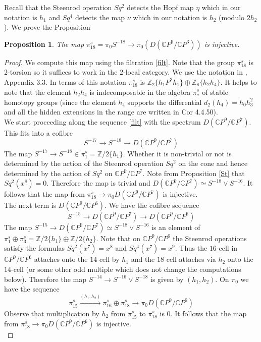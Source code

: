 \documentclass[a4paper,leqno,12pt]{amsart}
\theoremstyle{plain}
\newtheorem{prop}[theorem]{Proposition}
\theoremstyle{definition}
\numberwithin{equation}{section}
\begin{document}
Recall that the Steenrod operation $Sq^2$ detects the Hopf map $\eta$ which in our notation is $h_1$ and $Sq^4$ detects the map $\nu$ which in our notation is $h_2$ (modulo $2h_2$). We prove the Proposition
\begin{prop}\label{inj18}
The map $\pi_{18}^s = \pi_0 S^{-18} \to \pi_0 (D ({\mathbb{C}} P^9/ {\mathbb{C}} P^3))$ is injective. 
\end{prop}

\begin{proof}
We compute this map using the filtration \ref{filt}. Note that the group $\pi_{18}^s$ is $2$-torsion so it suffices to work in the $2$-local category. We use the notation in \cite{Rav}, Appendix 3.3. In terms of this notation $\pi_{18}^s$ is ${\mathbb{Z}}_2\{h_1P^2h_1\} \oplus {\mathbb{Z}}_8\{h_2h_4\}$. It helps to note that the element $h_2h_4$ is indecomposable in the algebra $\pi_*^s$ of stable homotopy groups (since the element $h_4$ supports the differential $d_2(h_4)=h_0 h_3^2$ and all the hidden extensions in the range are written in Cor 4.4.50). \\

We start proceeding along the sequence \ref{filt} with the spectrum $D({\mathbb{C}} P^9/ {\mathbb{C}} P^7)$. This fits into a cofibre 
$$S^{-17} \to S^{-18} \to D({\mathbb{C}} P^9/{\mathbb{C}} P^7)  $$
The map $S^{-17} \to S^{-18} \in \pi_1^s = {\mathbb{Z}}/2\{h_1\}$. Whether it is non-trivial or not is determined by the action of the Steenrod operation $Sq^2$ on the cone and hence determined by the action of $Sq^2$ on ${\mathbb{C}} P^9/{\mathbb{C}} P^7$. Note from Proposition \ref{St} that $Sq^2(x^8)=0$. Therefore the map is trivial and $D({\mathbb{C}} P^9/{\mathbb{C}} P^7) \simeq S^{-18}\vee S^{-16}$. It follows that the map from $\pi_{18}^s \to \pi_0 D({\mathbb{C}} P^9/ {\mathbb{C}} P^7)$ is injective. \\

The next term is $D({\mathbb{C}} P^9/ {\mathbb{C}} P^6)$. We have the cofibre sequence 
\begin{equation}\label{cof6}
S^{-15} \to D({\mathbb{C}} P^9/ {\mathbb{C}} P^7) \to D({\mathbb{C}} P^9/{\mathbb{C}} P^6) 
\end{equation}
The map $S^{-15} \to D({\mathbb{C}} P^9/{\mathbb{C}} P^7) \simeq S^{-18}\vee S^{-16}$ is an element of $\pi_1^s \oplus \pi_3^s = {\mathbb{Z}}/2\{h_1\}\oplus {\mathbb{Z}}/2\{h_2\}$. Note that on ${\mathbb{C}} P^9/{\mathbb{C}} P^6$ the Steenrod operations satisfy the formulas $Sq^2(x^7)=x^8$ and $Sq^4(x^7)=x^9$. Thus the $16$-cell in ${\mathbb{C}} P^9/{\mathbb{C}} P^6$ attaches onto the $14$-cell by $h_1$ and the $18$-cell attaches via $h_2$ onto the $14$-cell (or some other odd multiple which does not change the computations below). Therefore the map $S^{-14} \to S^{-16} \vee S^{-18}$  is given by $(h_1,h_2)$. On $\pi_0$ we have the sequence 
$$\pi_{15}^s \stackrel{(h_1,h_2)}{ \to} \pi_{16}^s \oplus \pi_{18}^s \to \pi_0 D({\mathbb{C}} P^9/{\mathbb{C}} P^6)$$ 
Observe that multiplication by $h_2$ from $\pi_{15}^s$ to $\pi_{18}^s$ is $0$.  It follows that the map from $\pi_{18}^s \to \pi_0 D({\mathbb{C}} P^9/ {\mathbb{C}} P^6)$ is injective. \\


\end{proof}
\end{document}
